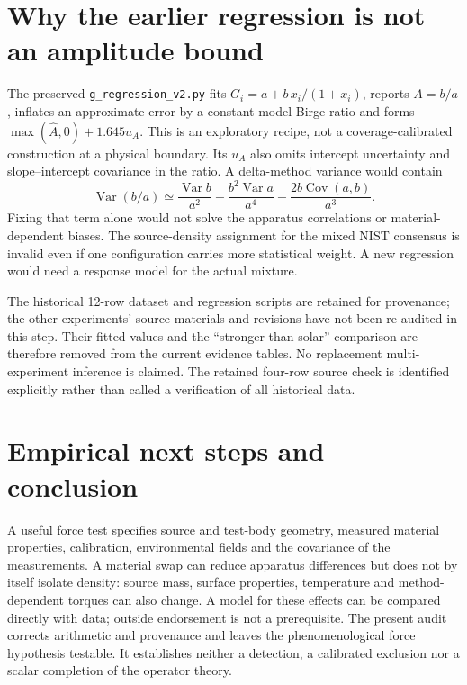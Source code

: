 \documentclass[11pt,a4paper]{article}
\begin{document}
\section{Why the earlier regression is not an amplitude bound}
The preserved \texttt{g\_regression\_v2.py} fits
$G_i=a+b\,x_i/(1+x_i)$, reports $A=b/a$, inflates an approximate error by
a constant-model Birge ratio and forms
$\max(\widehat A,0)+1.645u_A$. This is an exploratory recipe, not a
coverage-calibrated construction at a physical boundary. Its $u_A$ also
omits intercept uncertainty and slope--intercept covariance in the ratio.
A delta-method variance would contain
\begin{equation}
 \operatorname{Var}(b/a)\simeq
 \frac{\operatorname{Var}b}{a^2}
 +\frac{b^2\operatorname{Var}a}{a^4}
 -\frac{2b\operatorname{Cov}(a,b)}{a^3}.
\end{equation}
Fixing that term alone would not solve the apparatus correlations or
material-dependent biases. The source-density assignment for the mixed
NIST consensus is invalid even if one configuration carries more statistical
weight. A new regression would need a response model for the actual mixture.

The historical 12-row dataset and regression scripts are retained for
provenance; the other experiments' source materials and revisions have not
been re-audited in this step. Their fitted values and the ``stronger than
solar'' comparison are therefore removed from the current evidence tables.
No replacement multi-experiment inference is claimed. The retained four-row
source check is identified explicitly rather than called a verification of
all historical data.

\section{Empirical next steps and conclusion}
A useful force test specifies source and test-body geometry, measured material
properties, calibration, environmental fields and the covariance of the
measurements. A material swap can reduce apparatus differences but does not
by itself isolate density: source mass, surface properties, temperature and
method-dependent torques can also change. A model for these effects can be
compared directly with data; outside endorsement is not a prerequisite.
The present audit corrects arithmetic and provenance and leaves the
phenomenological force hypothesis testable. It establishes neither a detection,
a calibrated exclusion nor a scalar completion of the operator theory.
\end{document}
